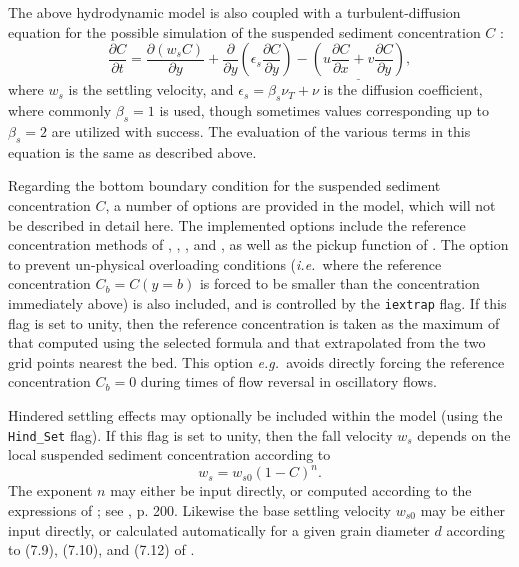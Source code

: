 \documentclass[12pt]{article}
\newcommand{\ie}{{\it i.e.\ }}
\newcommand{\eg}{{\it e.g.\ }}
\begin{document}
The above hydrodynamic model is also coupled with a
turbulent-diffusion equation for the possible simulation of the
suspended sediment concentration $C$ \citep[see
\eg][p.~238]{FredsoeDeigaard1992}:
%
\begin{equation}
\frac{\partial C}{\partial t} = 
\frac{\partial \left(w_s C\right)}{\partial y}
+ \frac{\partial}{\partial y}\left(\epsilon_s \frac{\partial C}{\partial
    y}\right) %
-\underline{
 \left( u\frac{\partial C}{\partial x} + v\frac{\partial C}{\partial
    y} \right) %
},
\label{eqn:C}
\end{equation}
%
where $w_s$ is the settling velocity, and
$\epsilon_s=\beta_s\nu_T+\nu$ is the diffusion coefficient, where
commonly $\beta_s=1$ is used, though sometimes values corresponding up
to $\beta_s=2$ \citep[\eg][]{Ruessinketal2009} are utilized with
success.  The evaluation of the various terms in this equation is the
same as described above.

Regarding the bottom boundary condition for the suspended sediment
concentration $C$, a number of options are provided in the model,
which will not be described in detail here.  The implemented options
include the reference concentration methods of
\cite{EngelundFredsoe1976}, \cite{ZysermanFredsoe1994},
\cite{Einstein1950}, and \cite{ODonoghueWright2004}, as well as the
pickup function of \cite{vanRijn1984}.  The option to prevent
un-physical overloading conditions (\ie where the reference
concentration $C_b=C(y=b)$ is forced to be smaller than the
concentration immediately above) is also included, and is controlled
by the \texttt{iextrap} flag.  If this flag is set to unity, then the
reference concentration is taken as the maximum of that computed using
the selected formula and that extrapolated from the two grid points
nearest the bed.  This option \eg avoids directly forcing the
reference concentration $C_b=0$ during times of flow reversal in
oscillatory flows.

Hindered settling effects may optionally be included within the model
(using the \texttt{Hind\_Set} flag).  If this flag is set to unity,
then the fall velocity $w_s$ depends on the local suspended sediment
concentration according to
%
\begin{equation}
w_s = w_{s0}(1-C)^n.
\end{equation}
%
The exponent $n$ may either be input directly, or computed according
to the expressions of \cite{RichardsonZaki1954}; see
\cite{FredsoeDeigaard1992}, p. 200.  Likewise the base settling
velocity $w_{s0}$ may be either input directly, or calculated
automatically for a given grain diameter $d$ according to (7.9),
(7.10), and (7.12) of \cite{FredsoeDeigaard1992}.
\end{document}
